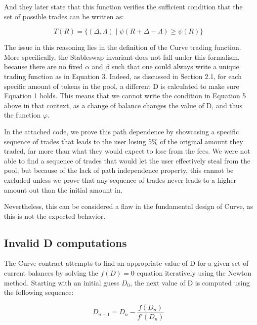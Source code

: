 \documentclass{article}
\begin{document}
    And they later state that this function verifies the sufficient condition that the set of possible trades can be written as: 

    \begin{equation}
        T(R)=\{(\Delta, \Lambda) \mid \psi(R+\Delta-\Lambda) \geq \psi(R)\}
    \end{equation}

    The issue in this reasoning lies in the definition of the Curve trading function. More specifically, the Stableswap invariant does not fall under this formalism, because there are no fixed $\alpha$ and $\beta$ such that one could always write a unique trading function as in Equation 3. Indeed, as discussed in Section 2.1, for each specific amount of tokens in the pool, a different D is calculated to make sure Equation 1 holds. This means that we cannot write the condition in Equation 5 above in that context, as a change of balance changes the value of D, and thus the function $\varphi$. 

    In the attached code, we prove this path dependence by showcasing a specific sequence of trades that leads to the user losing 5\% of the original amount they traded, far more than what they would expect to lose from the fees. We were not able to find a sequence of trades that would let the user effectively steal from the pool, but because of the lack of path independence property, this cannot be excluded unless we prove that any sequence of trades never leads to a higher amount out than the initial amount in.

    Nevertheless, this can be considered a flaw in the fundamental design of Curve, as this is not the expected behavior. 

    \subsection{Invalid D computations}
    
    The Curve contract attempts to find an appropriate value of D for a given set of current balances by solving the $f(D) = 0$ equation iteratively using the Newton method. Starting with an initial guess $D_{0}$, the next value of D is computed using the following sequence: 

    \begin{equation}
        D_{n+1} = D_{n} - \frac{f(D_{n})}{f'(D_{n})}
    \end{equation}
\end{document}
